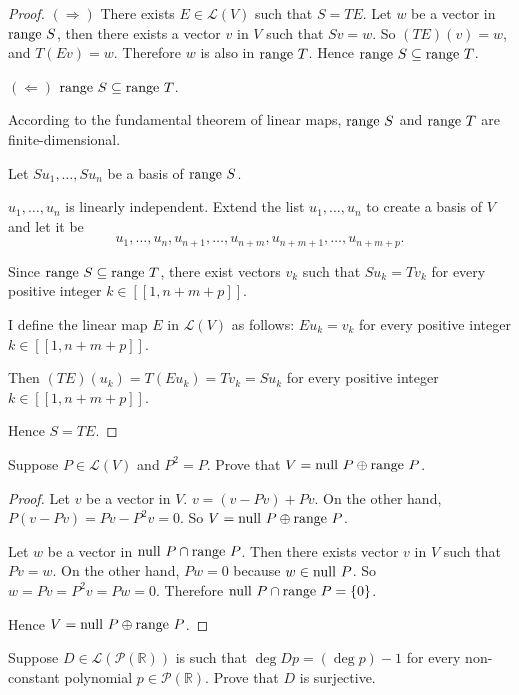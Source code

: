 \begin{proof}
    $(\Rightarrow)$ There exists $E \in \mathcal{L}(V)$ such that $S = TE$. Let $w$ be a vector in $\operatorname{range}\,{S}$, then there exists a vector $v$ in $V$ such that $Sv = w$. So $(TE)(v) = w$, and $T(Ev) = w$. Therefore $w$ is also in $\operatorname{range}\,{T}$. Hence $\operatorname{range}\,{S}\subseteq\operatorname{range}\,{T}$.

    $(\Leftarrow)$ $\operatorname{range}\,{S} \subseteq \operatorname{range}\,{T}$.

    According to the fundamental theorem of linear maps, $\operatorname{range}\,{S}$ and $\operatorname{range}\,{T}$ are finite-dimensional.

    Let $Su_{1}, \ldots, Su_{n}$ be a basis of $\operatorname{range}\,{S}$.

    $u_{1}, \ldots, u_{n}$ is linearly independent. Extend the list $u_{1}, \ldots, u_{n}$ to create a basis of $V$ and let it be
    \[
        u_{1}, \ldots, u_{n}, u_{n+1}, \ldots, u_{n+m}, u_{n+m+1}, \ldots, u_{n+m+p}.
    \]

    Since $\operatorname{range}\,{S}\subseteq \operatorname{range}\,{T}$, there exist vectors $v_{k}$ such that $Su_{k} = Tv_{k}$ for every positive integer $k\in [\![ 1, n+m+p ]\!]$.

    I define the linear map $E$ in $\mathcal{L}(V)$ as follows: $Eu_{k} = v_{k}$ for every positive integer $k\in [\![ 1, n+m+p ]\!]$.

    Then $(TE)(u_{k}) = T(Eu_{k}) = Tv_{k} = Su_{k}$ for every positive integer $k\in [\![ 1, n+m+p ]\!]$.

    Hence $S = TE$.\qedhere
\end{proof}
\newpage

\begin{exercise}
    Suppose $P \in \mathcal{L}(V)$ and $P^{2} = P$. Prove that $V = \operatorname{null}\,{P}\oplus \operatorname{range}\,{P}$.
\end{exercise}

\begin{proof}
    Let $v$ be a vector in $V$. $v = (v - Pv) + Pv$. On the other hand, $P(v - Pv) = Pv - P^{2}v = 0$. So $V = \operatorname{null}\,{P}\oplus \operatorname{range}\,{P}$.

    Let $w$ be a vector in $\operatorname{null}\,{P}\cap\operatorname{range}\,{P}$. Then there exists vector $v$ in $V$ such that $Pv = w$. On the other hand, $Pw = 0$ because $w\in\operatorname{null}\,{P}$. So $w = Pv = P^{2}v = Pw = 0$. Therefore $\operatorname{null}\,{P}\cap\operatorname{range}\,{P} = \{0\}$.

    Hence $V = \operatorname{null}\,{P}\oplus\operatorname{range}\,{P}$.
\end{proof}
\newpage

\begin{exercise}
    Suppose $D \in \mathcal{L}(\mathcal{P}(\mathbb{R}))$ is such that $\deg Dp = (\deg p) - 1$ for every non-constant polynomial $p \in \mathcal{P}(\mathbb{R})$. Prove that $D$ is surjective.
\end{exercise}

